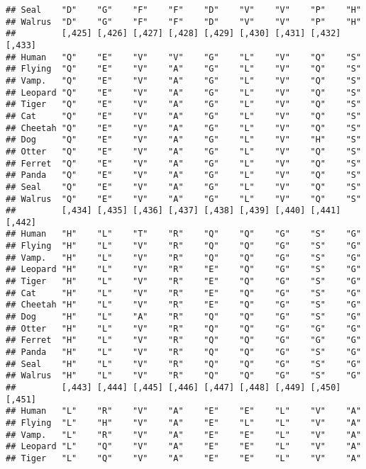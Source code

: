 \documentclass[]{article}
\begin{document}
\begin{verbatim}
## Seal    "D"    "G"    "F"    "F"    "D"    "V"    "V"    "P"    "H"   
## Walrus  "D"    "G"    "F"    "F"    "D"    "V"    "V"    "P"    "H"   
##         [,425] [,426] [,427] [,428] [,429] [,430] [,431] [,432] [,433]
## Human   "Q"    "E"    "V"    "V"    "G"    "L"    "V"    "Q"    "S"   
## Flying  "Q"    "E"    "V"    "A"    "G"    "L"    "V"    "Q"    "S"   
## Vamp.   "Q"    "E"    "V"    "A"    "G"    "L"    "V"    "Q"    "S"   
## Leopard "Q"    "E"    "V"    "A"    "G"    "L"    "V"    "Q"    "S"   
## Tiger   "Q"    "E"    "V"    "A"    "G"    "L"    "V"    "Q"    "S"   
## Cat     "Q"    "E"    "V"    "A"    "G"    "L"    "V"    "Q"    "S"   
## Cheetah "Q"    "E"    "V"    "A"    "G"    "L"    "V"    "Q"    "S"   
## Dog     "Q"    "E"    "V"    "A"    "G"    "L"    "V"    "H"    "S"   
## Otter   "Q"    "E"    "V"    "A"    "G"    "L"    "V"    "Q"    "S"   
## Ferret  "Q"    "E"    "V"    "A"    "G"    "L"    "V"    "Q"    "S"   
## Panda   "Q"    "E"    "V"    "A"    "G"    "L"    "V"    "Q"    "S"   
## Seal    "Q"    "E"    "V"    "A"    "G"    "L"    "V"    "Q"    "S"   
## Walrus  "Q"    "E"    "V"    "A"    "G"    "L"    "V"    "Q"    "S"   
##         [,434] [,435] [,436] [,437] [,438] [,439] [,440] [,441] [,442]
## Human   "H"    "L"    "T"    "R"    "Q"    "Q"    "G"    "S"    "G"   
## Flying  "H"    "L"    "V"    "R"    "Q"    "Q"    "G"    "S"    "G"   
## Vamp.   "H"    "L"    "V"    "R"    "Q"    "Q"    "G"    "S"    "G"   
## Leopard "H"    "L"    "V"    "R"    "E"    "Q"    "G"    "S"    "G"   
## Tiger   "H"    "L"    "V"    "R"    "E"    "Q"    "G"    "S"    "G"   
## Cat     "H"    "L"    "V"    "R"    "E"    "Q"    "G"    "S"    "G"   
## Cheetah "H"    "L"    "V"    "R"    "E"    "Q"    "G"    "S"    "G"   
## Dog     "H"    "L"    "A"    "R"    "Q"    "Q"    "G"    "S"    "G"   
## Otter   "H"    "L"    "V"    "R"    "Q"    "Q"    "G"    "G"    "G"   
## Ferret  "H"    "L"    "V"    "R"    "Q"    "Q"    "G"    "G"    "G"   
## Panda   "H"    "L"    "V"    "R"    "Q"    "Q"    "G"    "S"    "G"   
## Seal    "H"    "L"    "V"    "R"    "Q"    "Q"    "G"    "S"    "G"   
## Walrus  "H"    "L"    "V"    "R"    "Q"    "Q"    "G"    "S"    "G"   
##         [,443] [,444] [,445] [,446] [,447] [,448] [,449] [,450] [,451]
## Human   "L"    "R"    "V"    "A"    "E"    "E"    "L"    "V"    "A"   
## Flying  "L"    "H"    "V"    "A"    "E"    "L"    "L"    "V"    "A"   
## Vamp.   "L"    "R"    "V"    "A"    "E"    "E"    "L"    "V"    "A"   
## Leopard "L"    "Q"    "V"    "A"    "E"    "E"    "L"    "V"    "A"   
## Tiger   "L"    "Q"    "V"    "A"    "E"    "E"    "L"    "V"    "A"   

\end{verbatim}
\end{document}

